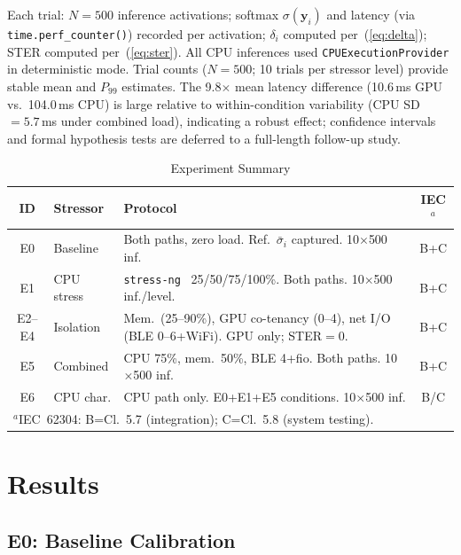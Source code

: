 \documentclass[journal,twoside,9pt]{IEEEtran}
\begin{document}
Each trial: $N=500$ inference activations; softmax $\sigma(\mathbf{y}_i)$ and latency
(via \texttt{time.perf\_counter()}) recorded per activation; $\delta_i$
computed per~(\ref{eq:delta}); STER computed per~(\ref{eq:ster}). All CPU inferences
used \texttt{CPUExecutionProvider} in deterministic mode. Trial counts ($N=500$;
10 trials per stressor level) provide stable mean and $P_{99}$ estimates.
The 9.8$\times$ mean latency difference (10.6\,ms GPU vs.\ 104.0\,ms CPU) is large
relative to within-condition variability (CPU SD\,$=5.7$\,ms under combined load),
indicating a robust effect; confidence intervals and formal hypothesis tests are
deferred to a full-length follow-up study.

\begin{table}[t]
  \caption{Experiment Summary}
  \label{tab:experiments}
  \centering
  \footnotesize
  \setlength{\tabcolsep}{4pt}
  \begin{tabular}{@{}clp{3.8cm}c@{}}
    \toprule
    \textbf{ID} & \textbf{Stressor} & \textbf{Protocol} & \textbf{IEC}$^a$ \\
    \midrule
    E0 & Baseline & Both paths, zero load. Ref.\ $\bar{\sigma}_i$ captured. 10$\times$500 inf. & B+C \\
    E1 & CPU stress & \texttt{stress-ng}~\cite{king2023} 25/50/75/100\%. Both paths. 10$\times$500 inf./level. & B+C \\
    E2--E4 & Isolation & Mem.\ (25--90\%), GPU co-tenancy (0--4), net I/O (BLE 0--6+WiFi). GPU only; STER$=0$. & B+C \\
    E5 & Combined & CPU 75\%, mem.\ 50\%, BLE 4+fio. Both paths. 10$\times$500 inf. & B+C \\
    E6 & CPU char. & CPU path only. E0+E1+E5 conditions. 10$\times$500 inf. & B/C \\
    \bottomrule
    \multicolumn{4}{l}{\scriptsize $^a$IEC~62304: B=Cl.~5.7 (integration); C=Cl.~5.8 (system testing).}
  \end{tabular}
\end{table}

\section{Results}
\label{sec:results}

\subsection{E0: Baseline Calibration}
\end{document}
